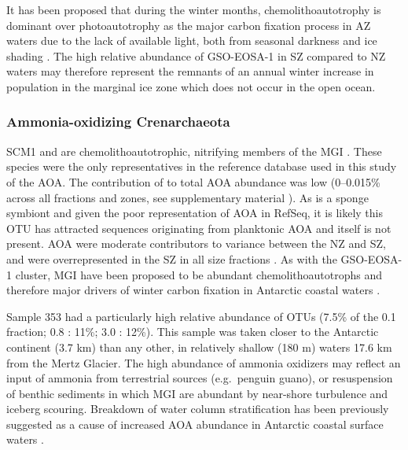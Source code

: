 It has been proposed that during the winter months, chemolithoautotrophy is dominant over photoautotrophy as the major carbon fixation process in \ac{AZ} waters due to the lack of available light, both from seasonal darkness and ice shading \cite{Grzymski:2012ej}.
The high relative abundance of \ac{GSO-EOSA-1} in \ac{SZ} compared to \ac{NZ} waters may therefore represent the remnants of an annual winter increase in population in the marginal ice zone which does not occur in the open ocean.

\subsubsection{Ammonia-oxidizing Crenarchaeota}

 SCM1 and  are chemolithoautotrophic, nitrifying members of the \ac{MGI} \cite{Preston:1996vi,Walker:2010ww}.
These species were the only representatives in the reference database used in this study of the \ac{AOA}.
The contribution of  to total \ac{AOA} abundance was low (0--0.015\% across all fractions and zones, see supplementary material ).
As  is a sponge symbiont \cite{Preston:1996vi} and given the poor representation of \ac{AOA} in RefSeq, it is likely this \ac{OTU} has attracted sequences originating from planktonic \ac{AOA} and  itself is not present.
\ac{AOA} were moderate contributors to variance between the \ac{NZ} and \ac{SZ}, and were overrepresented in the \ac{SZ} in all size fractions .
As with the GSO-EOSA-1 cluster, \ac{MGI} have been proposed to be abundant chemolithoautotrophs and therefore major drivers of winter carbon fixation in Antarctic coastal waters \cite{Grzymski:2012ej,Williams:2012bs}.

Sample 353 had a particularly high relative abundance of  \acp{OTU} (7.5\% of the 0.1 \micron{} fraction; 0.8 \micron: 11\%; 3.0 \micron: 12\%).
This sample was taken closer to the Antarctic continent (3.7 km) than any other, in relatively shallow (180 m) waters 17.6 km from the Mertz Glacier.
The high abundance of ammonia oxidizers may reflect an input of ammonia from terrestrial sources (e.g.\ penguin guano), or resuspension of benthic sediments in which \ac{MGI} are abundant \cite{Bowman:2003fa} by near-shore turbulence and iceberg scouring.
Breakdown of water column stratification has been previously suggested as a cause of increased \ac{AOA} abundance in Antarctic coastal surface waters \cite{Kalanetra:2009bv}.

